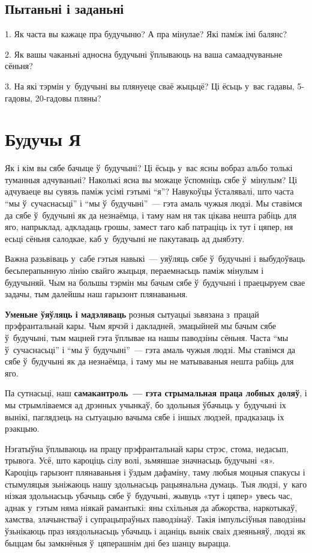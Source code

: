\subsection*{Пытаньні і заданьні}

1. Як часта вы кажаце пра будучыню? А пра мінулае? Які паміж імі балянс?

2. Як вашы чаканьні адносна будучыні ўплываюць на ваша самаадчуваньне сёньня?

3. На які тэрмін у~будучыні вы плянуеце сваё жыцьцё? Ці ёсьць у~вас гадавы, 5-гадовы, 20-гадовы пляны?


\section{Будучы Я}

Як і кім вы сябе бачыце ў~будучыні? Ці ёсьць у~вас ясны вобраз альбо толькі туманныя адчуваньні? Наколькі ясна вы можаце ўспомніць сябе ў~мінулым? Ці адчуваеце вы сувязь паміж усімі гэтымі ``я''? Навукоўцы ўсталявалі, што часта ``мы ў~сучаснасьці'' і ``мы ў~будучыні''~--- гэта амаль чужыя людзі. Мы ставімся да сябе ў~будучыні як да незнаёмца, і таму нам ня так цікава нешта рабіць для яго, напрыклад, адкладаць грошы, замест таго каб патраціць іх тут і цяпер, ня есьці сёньня салодкае, каб у~будучыні не пакутаваць ад дыябэту.

Важна разьвіваць у~сабе гэтыя навыкі~--- уяўляць сябе ў~будучыні і выбудоўваць бесьперапынную лінію свайго жыцьця, пераемнасьць паміж мінулым і будучыняй. Чым на большы тэрмін мы бачым сябе ў~будучыні і праецыруем свае задачы, тым далейшы наш гарызонт плянаваньня.

\textbf{Уменьне ўяўляць і мадэляваць} розныя сытуацыі зьвязана з~працай прэфрантальнай кары. Чым ярчэй і дакладней, эмацыйней мы бачым сябе ў~будучыні, тым мацней гэта ўплывае на нашы паводзіны сёньня. Часта ``мы ў~сучаснасьці'' і ``мы ў~будучыні''~--- гэта амаль чужыя людзі. Мы ставімся да сябе ў~будучыні як да незнаёмца, і таму мы не матываваныя нешта рабіць для яго.

Па сутнасьці, наш \textbf{самакантроль~--- гэта стрымальная праца лобных доляў}, і мы стрымліваемся ад дрэнных учынкаў, бо здольныя ўбачыць у~будучыні іх вынікі, паглядзець на сытуацыю вачыма сябе і іншых людзей, прадказаць іх рэакцыю.

Нэгатыўна ўплываюць на працу прэфрантальнай кары стрэс, стома, недасып, трывога. Усё, што кароціць сілу волі, зьмяншае значнасьць будучыні «я». Кароціць гарызонт плянаваньня і ўздым дафаміну, таму любыя моцныя спакусы і стымуляцыя зьніжаюць нашу здольнасьць рацыянальна думаць. Тыя людзі, у~каго нізкая здольнасьць убачыць сябе ў~будучыні, жывуць «тут і цяпер» увесь час, аднак у~гэтым няма ніякай рамантыкі: яны схільныя да абжорства, наркотыкаў, хамства, злачынстваў і супрацьпраўных паводзінаў. Такія імпульсіўныя паводзіны ўзьнікаюць праз няздольнасьць убачыць і ацаніць вынік сваіх дзеяньняў, людзі як быццам бы замкнёныя ў~цяперашнім дні без шанцу вырацца.

